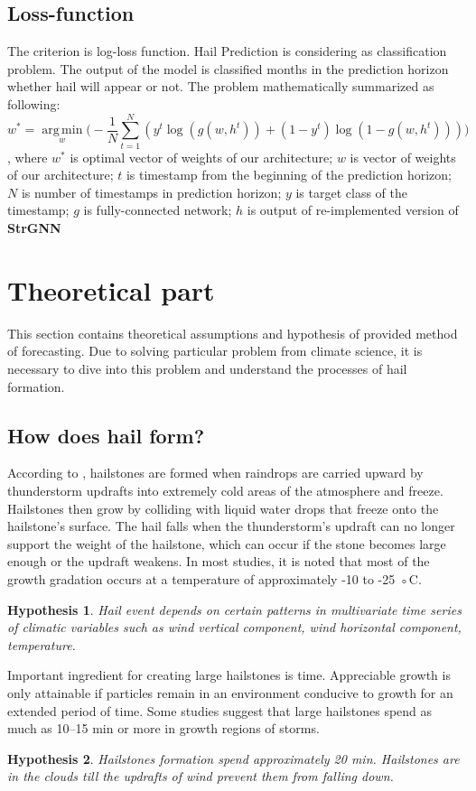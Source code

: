 \documentclass{article}
\DeclareMathOperator*{\argmin}{arg\,min}
\begin{document}
\subsection{Loss-function}
The criterion is  log-loss function. Hail Prediction is considering as classification problem. The output of the model is classified months in the prediction horizon whether hail will appear or not.
The problem mathematically summarized as following:
\begin{equation}
    w^* = \argmin\limits_w \Big ( - \frac{1}{N}\sum\limits_{t = 1 }^{N}(y ^ t \log(g(w, h^t)) + (1 - y ^ t)\log(1 - g(w, h^t)))\Big )
\end{equation}
, where  $w^*$ is optimal vector of weights of our architecture; $w$ is vector of weights of our architecture; $t$ is timestamp from the beginning of the prediction horizon; $N$ is number of timestamps in prediction horizon; $y$ is target class of the timestamp; $g$ is fully-connected network; $h$ is output of re-implemented version of \textbf{StrGNN}~\cite{DBLP:journals/corr/abs-2005-07427}\\

\section{Theoretical part}
This section contains theoretical assumptions and hypothesis of provided method of forecasting. Due to solving particular problem from climate science, it is necessary to dive into this problem and understand the processes of hail formation.
\subsection{How does hail form?}
According to \cite{hailform}, hailstones are formed when raindrops are carried upward by thunderstorm updrafts into extremely cold areas of the atmosphere and freeze. Hailstones then grow by colliding with liquid water drops that freeze onto the hailstone’s surface. The hail falls when the thunderstorm's updraft can no longer support the weight of the hailstone, which can occur if the stone becomes large enough or the updraft weakens. In most studies, it is noted that most of the growth gradation occurs at a temperature of approximately -10 to -25 ◦C.

\newtheorem{Hypothesis}{Hypothesis}
\begin{Hypothesis}
Hail event depends on certain patterns in multivariate time series of climatic variables  such as wind vertical component, wind horizontal component, temperature.
\end{Hypothesis}
Important ingredient for creating large hailstones is time. Appreciable growth is only attainable if particles remain in an environment conducive to growth for an extended period of time. Some studies suggest that large hailstones spend as much as 10–15 min or more in growth regions of storms.
\begin{Hypothesis}
Hailstones formation spend approximately 20 min. Hailstones are in the clouds till the updrafts of wind prevent them from falling down.
\end{Hypothesis}
\end{document}

